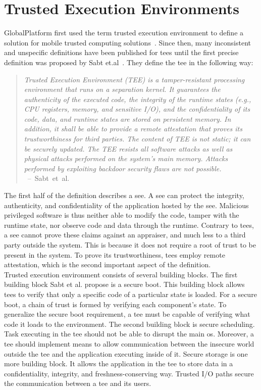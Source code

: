 \section{Trusted Execution Environments}
\label{sec:state:tee}
GlobalPlatform first used the term trusted execution environment to define a
solution for mobile trusted computing solutions~\cite{globaltee}. Since then,
many inconsistent and unspecific definitions have been published for \glspl{tee}
until the first precise definition was proposed by Sabt
et.al~\cite{sabt2015trusted}. They define the \gls{tee} in the following way:
\begin{quote}
  \textit{Trusted Execution Environment (TEE) is a tamper-resistant processing
    environment that runs on a separation kernel. It guarantees the authenticity of
    the executed code, the integrity of the runtime states (e.g., CPU registers,
    memory, and sensitive I/O), and the confidentiality of its code, data, and
    runtime states are stored on persistent memory. In addition, it shall be able
    to provide a remote attestation that proves its trustworthiness for third
    parties. The content of TEE is not static; it can be securely updated. The TEE
    resists all software attacks as well as physical attacks performed on the
    system's main memory. Attacks performed by exploiting backdoor security flaws
    are not possible. \\
  } \mbox{ -- Sabt et al.~\cite{sabt2015trusted}}
\end{quote}

The first half of the definition describes a \gls{see}. A \gls{see} can protect
the integrity, authenticity, and confidentiality of the application hosted by
the \gls{see}. Malicious privileged software is thus neither able to modify the
code, tamper with the runtime state, nor observe code and data through the
runtime. Contrary to \glspl{tee}, a \gls{see} cannot prove these claims against
an appraiser, and much less to a third party outside the system. This is because
it does not require a root of trust to be present in the system. To prove its
trustworthiness, \glspl{tee} employ remote attestation, which is the second
important aspect of the definition.\\

Trusted execution environment consists of several building blocks. The first
building block Sabt et al. propose is a secure boot. This building block allows
\glspl{tee} to verify that only a specific code of a particular state is loaded.
For a secure boot, a chain of trust is formed by verifying each component's
state. To generalize the secure boot requirement, a \gls{tee} must be capable of
verifying what code it loads to the environment. The second building block is
secure scheduling. Task executing in the \gls{tee} should not be able to disrupt
the main \gls{os}. Moreover, a \gls{tee} should implement means to allow
communication between the insecure world outside the \gls{tee} and the
application executing inside of it. Secure storage is one more building block.
It allows the application in the \gls{tee} to store data in a confidentiality,
integrity, and freshness-conserving way. Trusted I/O paths secure the
communication between a \gls{tee} and its users.\\

